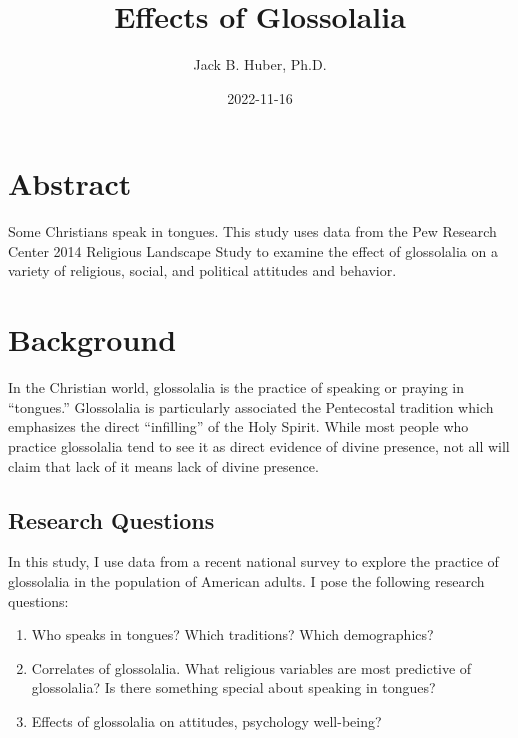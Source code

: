 \documentclass[
  letterpaper,
  DIV=11,
  numbers=noendperiod]{scrreprt}
\title{Effects of Glossolalia}
\author{Jack B. Huber, Ph.D.}
\date{2022-11-16}
\providecommand{\tightlist}{%
  \setlength{\itemsep}{0pt}\setlength{\parskip}{0pt}}\usepackage{longtable,booktabs,array}
\renewcommand*\contentsname{Table of contents}
\newcommand\contentsname{Table of contents}
\begin{document}
\maketitle

\renewcommand*\contentsname{Table of contents}
{
\hypersetup{linkcolor=}
\setcounter{tocdepth}{2}
\tableofcontents
}


\chapter*{Abstract}\label{abstract}


Some Christians speak in tongues. This study uses data from the Pew
Research Center 2014 Religious Landscape Study to examine the effect of
glossolalia on a variety of religious, social, and political attitudes
and behavior.


\chapter*{Background}\label{background}


In the Christian world, glossolalia is the practice of speaking or
praying in ``tongues.'' Glossolalia is particularly associated the
Pentecostal tradition which emphasizes the direct ``infilling'' of the
Holy Spirit. While most people who practice glossolalia tend to see it
as direct evidence of divine presence, not all will claim that lack of
it means lack of divine presence.

\section*{Research Questions}\label{research-questions}


In this study, I use data from a recent national survey to explore the
practice of glossolalia in the population of American adults. I pose the
following research questions:

\begin{enumerate}
\def\labelenumi{\arabic{enumi}.}
\tightlist
\item
  Who speaks in tongues? Which traditions? Which demographics?
\item
  Correlates of glossolalia. What religious variables are most
  predictive of glossolalia? Is there something special about speaking
  in tongues?
\item
  Effects of glossolalia on attitudes, psychology well-being?
\end{enumerate}
\end{document}
